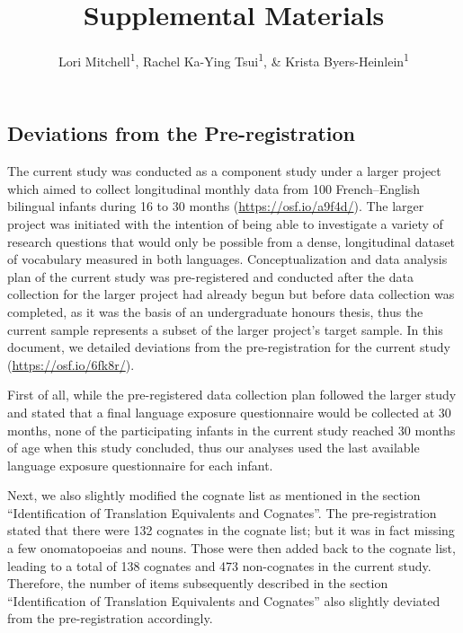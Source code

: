 \documentclass[
  ,man,floatsintext]{apa6}
\title{Supplemental Materials}
\author{Lori Mitchell\textsuperscript{1}, Rachel Ka-Ying Tsui\textsuperscript{1}, \& Krista Byers-Heinlein\textsuperscript{1}}
\date{}
\affiliation{\vspace{0.5cm}\textsuperscript{1} Concordia University}
\begin{document}
\maketitle

\captionsetup[table]{labelformat=empty}

\hypertarget{deviations-from-the-pre-registration}{%
\subsection{Deviations from the Pre-registration}\label{deviations-from-the-pre-registration}}

The current study was conducted as a component study under a larger project which aimed to collect longitudinal monthly data from 100 French--English bilingual infants during 16 to 30 months (\url{https://osf.io/a9f4d/}). The larger project was initiated with the intention of being able to investigate a variety of research questions that would only be possible from a dense, longitudinal dataset of vocabulary measured in both languages. Conceptualization and data analysis plan of the current study was pre-registered and conducted after the data collection for the larger project had already begun but before data collection was completed, as it was the basis of an undergraduate honours thesis, thus the current sample represents a subset of the larger project's target sample. In this document, we detailed deviations from the pre-registration for the current study (\url{https://osf.io/6fk8r/}).

First of all, while the pre-registered data collection plan followed the larger study and stated that a final language exposure questionnaire would be collected at 30 months, none of the participating infants in the current study reached 30 months of age when this study concluded, thus our analyses used the last available language exposure questionnaire for each infant.

Next, we also slightly modified the cognate list as mentioned in the section ``Identification of Translation Equivalents and Cognates''. The pre-registration stated that there were 132 cognates in the cognate list; but it was in fact missing a few onomatopoeias and nouns. Those were then added back to the cognate list, leading to a total of 138 cognates and 473 non-cognates in the current study. Therefore, the number of items subsequently described in the section ``Identification of Translation Equivalents and Cognates'' also slightly deviated from the pre-registration accordingly.
\end{document}
